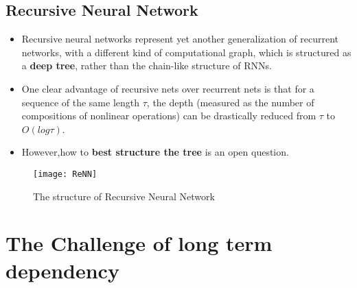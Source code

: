 	\subsection{Recursive Neural Network}
		\begin{itemize}
			\item Recursive neural networks represent yet another generalization of recurrent networks, with a different kind of computational graph, which is structured as a \textbf{deep tree}, rather than the chain-like structure of RNNs.
			\item One clear advantage of recursive nets over recurrent nets is that for a sequence of the same length $\tau$, the depth (measured as the number of compositions of nonlinear operations) can be drastically reduced from $\tau$ to $O(log \tau)$.
			\item However,how to \textbf{best structure the tree} is an open question.
		\end{itemize}
		\begin{figure}[H]
			\centering
			\texttt{[image: ReNN]}
			\caption{The structure of Recursive Neural Network}
		\end{figure}

\section{The Challenge of long term dependency}
